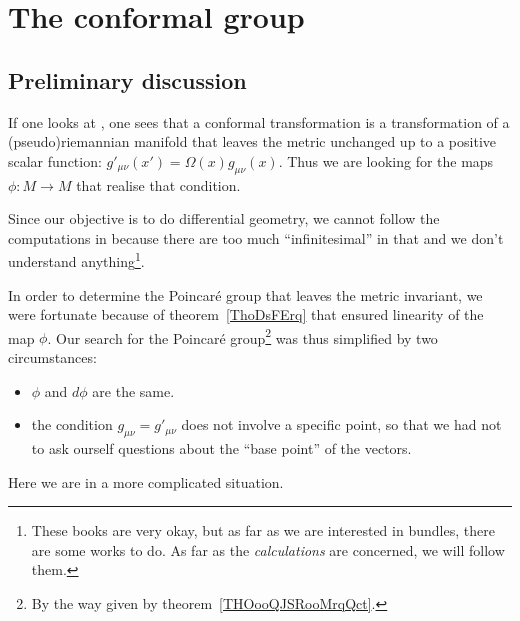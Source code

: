 
\section{The conformal group}

\subsection{Preliminary discussion}

If one looks at \cite{ooIYOHooMRMfXl,ooDPRUooOFPyPH}, one sees that a conformal transformation is a transformation of a (pseudo)riemannian manifold that leaves the metric unchanged up to a positive scalar function: \( g'_{\mu\nu}(x')=\Omega(x)g_{\mu\nu}(x)\). Thus we are looking for the maps \( \phi\colon M\to M\) that realise that condition.

Since our objective is to do differential geometry, we cannot follow the computations in \cite{ooIYOHooMRMfXl,ooDPRUooOFPyPH} because there are too much ``infinitesimal'' in that and we don't understand anything\footnote{These books are very okay, but as far as we are interested in bundles, there are some works to do. As far as the \emph{calculations} are concerned, we will follow them.}.

In order to determine the Poincaré group that leaves the metric invariant, we were fortunate because of theorem~\ref{ThoDsFErq} that ensured linearity of the map \( \phi\). Our search for the Poincaré group\footnote{By the way given by theorem~\ref{THOooQJSRooMrqQct}.} was thus simplified by two circumstances:
\begin{itemize}
    \item \( \phi\) and \( d\phi\) are the same.
    \item the condition \( g_{\mu\nu}=g'_{\mu\nu}\) does not involve a specific point, so that we had not to ask ourself questions about the ``base point'' of the vectors.
\end{itemize}
Here we are in a more complicated situation.

